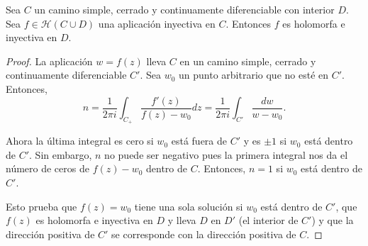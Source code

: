 \bigskip

\begin{theorem}
    Sea $C$ un camino simple, cerrado y continuamente diferenciable con interior $D$. Sea $f \in \mathcal{H}(C \cup D)$ una aplicación inyectiva en $C$. Entonces $f$ es holomorfa e inyectiva en $D$.
\end{theorem}

\begin{proof}
    La aplicación $w = f(z)$ lleva $C$ en un camino simple, cerrado y continuamente diferenciable $C'$. Sea $w_0$ un punto arbitrario que no esté en $C'$. Entonces,
    \begin{equation*}
        n = \dfrac{1}{2 \pi i} \int_{C_+} \dfrac{f'(z)}{f(z) - w_0} dz =  \dfrac{1}{2 \pi i} \int_{C'} \dfrac{dw}{w - w_0}.
    \end{equation*}

    Ahora la última integral es cero si $w_0$ está fuera de $C'$ y es $\pm 1$ si $w_0$ está dentro de $C'$. Sin embargo, $n$ no puede ser negativo pues la primera integral nos da el número de ceros de $f(z) - w_0$ dentro de $C$. Entonces, $n=1$ si $w_0$ está dentro de $C'$.

    Esto prueba que $f(z) = w_0$ tiene una sola solución si $w_0$ está dentro de $C'$, que $f(z)$ es holomorfa e inyectiva en $D$ y lleva $D$ en $D'$ (el interior de $C'$) y que la dirección positiva de $C'$ se corresponde con la dirección positiva de $C$.
\end{proof}

